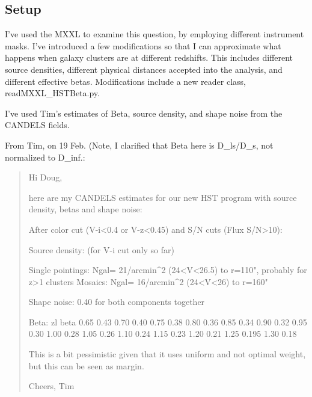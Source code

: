 \documentclass[11pt]{article}
\begin{document}
\subsection{Setup}
I've used the MXXL to examine this question, by employing different instrument masks. I've introduced a few modifications so that I can approximate what happens when galaxy clusters are at different redshifts. This includes different source densities, different physical distances accepted into the analysis, and different effective betas. Modifications include a new reader class, readMXXL_HSTBeta.py. 

I've used Tim's estimates of Beta, source density, and shape noise from the CANDELS fields. 

From Tim, on 19 Feb. (Note, I clarified that Beta here is D_ls/D_s, not normalized to D_inf.:
\begin{quote}
Hi Doug,

here are my CANDELS estimates for our new HST program with source density, betas and shape noise:


After color cut (V-i<0.4 or V-z<0.45) and S/N cuts (Flux S/N>10):

Source density: (for V-i cut only so far) 

Single pointings: Ngal= 21/arcmin^2 (24<V<26.5) to r=110", probably for z>1 clusters
Mosaics:          Ngal= 16/arcmin^2   (24<V<26)   to r=160"

Shape noise:
0.40 for both components together

Beta:
zl      beta
0.65  0.43  
0.70  0.40  
0.75  0.38   
0.80  0.36       
0.85  0.34   
0.90  0.32   
0.95  0.30   
1.00  0.28
1.05  0.26
1.10  0.24
1.15  0.23
1.20  0.21 
1.25  0.195
1.30  0.18

This is a bit pessimistic given that it uses uniform and not optimal weight, but this can be seen as margin.

Cheers, Tim
\end{quote}







\clearpage \newpage
\end{document}
